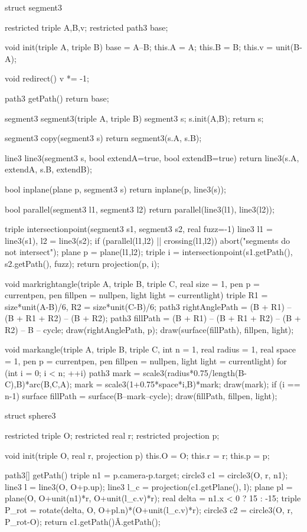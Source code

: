 struct segment3 {
	restricted triple A,B,v;
  	restricted path3 base;
  
  	void init(triple A, triple B) {
        base = A--B;
      	this.A = A; 
      	this.B = B;
        this.v = unit(B-A);
    }
  
  	void redirect() {
    	v *= -1;
    }
  	
  	path3 getPath() {
    	return base;
    }
  
}

segment3 segment3(triple A, triple B) {
	segment3 s; s.init(A,B);
  	return s;
}

segment3 copy(segment3 s) { 
  return segment3(s.A, s.B);
}

line3 line3(segment3 s, bool extendA=true, bool extendB=true) {
	return line3(s.A, extendA, s.B, extendB);
}

bool inplane(plane p, segment3 s) {
  	return inplane(p, line3(s));
}

bool parallel(segment3 l1, segment3 l2) {
  	return parallel(line3(l1), line3(l2));
}

triple intersectionpoint(segment3 s1, segment3 s2, real fuzz=-1) {
  	line3 l1 = line3(s1), l2 = line3(s2);
	if (parallel(l1,l2) || crossing(l1,l2)) abort("segments do not intersect");
  	plane p = plane(l1,l2);
  	triple i = intersectionpoint(s1.getPath(), s2.getPath(), fuzz);
  	return projection(p, i);
}


void markrightangle(triple A, triple B, triple C, real size = 1, pen p = currentpen, pen fillpen = nullpen, light light = currentlight) {
	triple R1 = size*unit(A-B)/6, R2 = size*unit(C-B)/6;
  	path3 rightAnglePath = (B + R1) -- (B + R1 + R2) -- (B + R2);
    path3 fillPath = (B + R1) -- (B + R1 + R2) -- (B + R2) -- B -- cycle;
    draw(rightAnglePath, p);
    draw(surface(fillPath), fillpen, light);
}

void markangle(triple A, triple B, triple C, int n = 1, real radius = 1, real space = 1, pen p = currentpen, pen fillpen = nullpen, light light = currentlight) {
	for (int i = 0; i < n; ++i) {
      	path3 mark = scale3(radius*0.75/length(B-C),B)*arc(B,C,A);
      	mark = scale3(1+0.75*space*i,B)*mark;
    	draw(mark);
      	if (i == n-1) {
        	surface fillPath = surface(B--mark--cycle);
          	draw(fillPath, fillpen, light);
        }
    }
}

struct sphere3 {
	restricted triple O;
  	restricted real r;
  	restricted projection p;
  	
  	void init(triple O, real r, projection p) {
      	this.O = O;
      	this.r = r;
    	this.p = p;
    }
  
  	path3[] getPath() {
      	triple n1 = p.camera-p.target;      
    	circle3 c1 = circle3(O, r, n1);     	
      	line3 l = line3(O, O+p.up); 
      	line3 l_c = projection(c1.getPlane(), l);
      	plane pl = plane(O, O+unit(n1)*r, O+unit(l_c.v)*r);
		real delta = n1.x < 0 ? 15 : -15;
      	triple P_rot = rotate(delta, O, O+pl.n)*(O+unit(l_c.v)*r);      
      	circle3 c2 = circle3(O, r, P_rot-O);
      	return c1.getPath()^^c2.getPath();
    }
}

